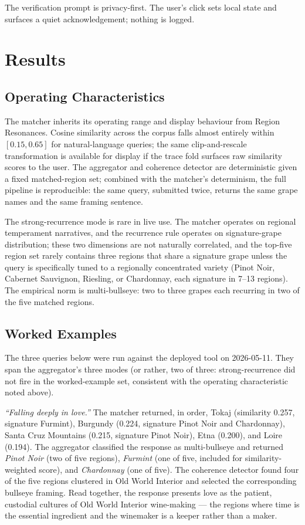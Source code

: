 \documentclass[11pt]{article}
\begin{document}
The verification prompt is privacy-first. The user's click sets local state and surfaces a quiet acknowledgement; nothing is logged.

\section{Results}

\subsection{Operating Characteristics}
The matcher inherits its operating range and display behaviour from Region Resonances. Cosine similarity across the corpus falls almost entirely within $[0.15, 0.65]$ for natural-language queries; the same clip-and-rescale transformation is available for display if the trace fold surfaces raw similarity scores to the user. The aggregator and coherence detector are deterministic given a fixed matched-region set; combined with the matcher's determinism, the full pipeline is reproducible: the same query, submitted twice, returns the same grape names and the same framing sentence.

The strong-recurrence mode is rare in live use. The matcher operates on regional temperament narratives, and the recurrence rule operates on signature-grape distribution; these two dimensions are not naturally correlated, and the top-five region set rarely contains three regions that share a signature grape unless the query is specifically tuned to a regionally concentrated variety (Pinot Noir, Cabernet Sauvignon, Riesling, or Chardonnay, each signature in 7--13 regions). The empirical norm is multi-bullseye: two to three grapes each recurring in two of the five matched regions.

\subsection{Worked Examples}
The three queries below were run against the deployed tool on 2026-05-11. They span the aggregator's three modes (or rather, two of three: strong-recurrence did not fire in the worked-example set, consistent with the operating characteristic noted above).

\emph{``Falling deeply in love.''} The matcher returned, in order, Tokaj (similarity 0.257, signature Furmint), Burgundy (0.224, signature Pinot Noir and Chardonnay), Santa Cruz Mountains (0.215, signature Pinot Noir), Etna (0.200), and Loire (0.194). The aggregator classified the response as multi-bullseye and returned \emph{Pinot Noir} (two of five regions), \emph{Furmint} (one of five, included for similarity-weighted score), and \emph{Chardonnay} (one of five). The coherence detector found four of the five regions clustered in Old World Interior and selected the corresponding bullseye framing. Read together, the response presents love as the patient, custodial cultures of Old World Interior wine-making --- the regions where time is the essential ingredient and the winemaker is a keeper rather than a maker.
\end{document}
